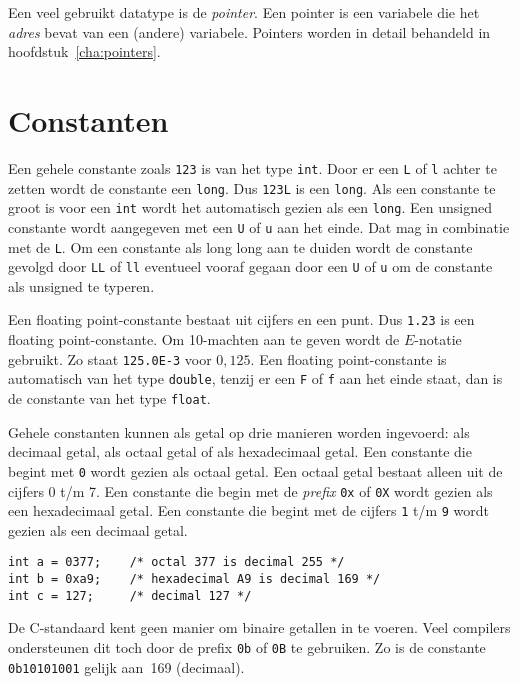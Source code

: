 Een veel gebruikt datatype is de \textsl{pointer}. Een pointer is een variabele die het \textsl{adres} bevat van een (andere) variabele. Pointers worden in detail behandeld in hoofdstuk~\ref{cha:pointers}.


\section{Constanten}
Een gehele constante zoals \texttt{123} is van het type \texttt{int}. Door er een \texttt{L} of \texttt{l} achter te zetten wordt de constante een \texttt{long}. Dus \texttt{123L} is een \texttt{long}. Als een constante te groot is voor een \texttt{int} wordt het automatisch gezien als een \texttt{long}. Een unsigned constante wordt aangegeven met een \texttt{U} of \texttt{u} aan het einde. Dat mag in combinatie met de \texttt{L}. Om een constante als long long aan te duiden wordt de constante gevolgd door \texttt{LL} of \texttt{ll} eventueel vooraf gegaan door een \texttt{U} of \texttt{u} om de constante als unsigned te typeren.

Een floating point-constante bestaat uit cijfers en een punt. Dus \texttt{1.23} is een floating point-constante. Om 10-machten aan te geven wordt de $E$-notatie gebruikt. Zo staat \texttt{125.0E-3} voor $0,125$. Een floating point-constante is automatisch van het type \texttt{double}, tenzij er een \texttt{F} of \texttt{f} aan het einde staat, dan is de constante van het type \texttt{float}.

Gehele constanten kunnen als getal op drie manieren worden ingevoerd: als decimaal getal, als octaal getal of als hexadecimaal getal. Een constante die begint met \texttt{0} wordt gezien als octaal getal. Een octaal getal bestaat alleen uit de cijfers 0 t/m 7. Een constante die begin met de \textsl{prefix} \texttt{0x} of \texttt{0X} wordt gezien als een hexadecimaal getal. Een constante die begint met de cijfers \texttt{1} t/m \texttt{9} wordt gezien als een decimaal getal.

\hspace*{1em}\texttt{int a = 0377; \ \ \ /* octal 377 is decimal 255 */}\\ 
\hspace*{1em}\texttt{int b = 0xa9; \ \ \ /* hexadecimal A9 is decimal 169 */}\\ 
\hspace*{1em}\texttt{int c = 127; \ \ \ \ /* decimal 127 */}

De C-standaard kent geen manier om binaire getallen in te voeren. Veel compilers ondersteunen dit toch door de prefix \texttt{0b} of \texttt{0B} te gebruiken. Zo is de constante \texttt{0b10101001} gelijk aan~169 (decimaal).

